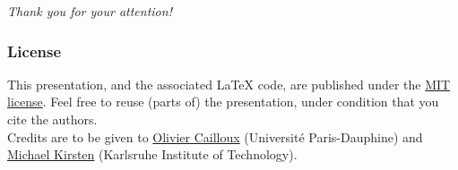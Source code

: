 \documentclass[french,english]{beamer}
\begin{document}
\begin{frame}[plain]
	\addtocounter{framenumber}{-1}
	\begin{center}
		\huge
		\textit{Thank you for your attention!}
	\end{center}
\end{frame}

\appendix
\AtBeginSection{
}

\clearpage{}
\begin{frame}%
	\frametitle{\refname}
 	
\end{frame}

\clearpage{}
\begin{frame}[plain]
	\frametitle{License}
	This presentation, and the associated \LaTeX{} code, are published under the \href{http://opensource.org/licenses/MIT}{MIT license}. Feel free to reuse (parts of) the presentation, under condition that you cite the authors.\\


	Credits are to be given to \href{http://www.lamsade.dauphine.fr/~ocailloux/}{Olivier Cailloux} (Université Paris-Dauphine) and \href{https://formal.iti.kit.edu/~kirsten/?lang=en}{Michael Kirsten} (Karlsruhe Institute of Technology).
\end{frame}
\addtocounter{framenumber}{-1}
\end{document}
